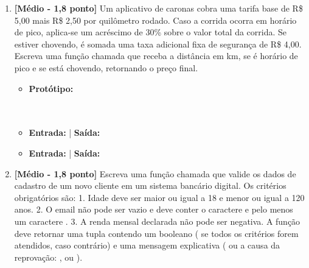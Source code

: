 \begin{enumerate}[label=\textbf{Q\arabic*.}, start=11]


\vspace{0.4cm}

\item \textbf{[Médio - 1,8 ponto]} Um aplicativo de caronas cobra uma tarifa base de R\$ 5,00 mais R\$ 2,50 por quilômetro rodado. Caso a corrida ocorra em horário de pico, aplica-se um acréscimo de 30\% sobre o valor total da corrida. Se estiver chovendo, é somada uma taxa adicional fixa de segurança de R\$ 4,00. Escreva uma função chamada  que receba a distância em km, se é horário de pico e se está chovendo, retornando o preço final.

\begin{itemize}[leftmargin=*]
    \item \textbf{Protótipo:}\newline {}\\\\\\
    \item \textbf{Entrada:}  | \textbf{Saída:} 
    \item \textbf{Entrada:}  | \textbf{Saída:} 
\end{itemize}



\vspace{0.4cm}

\item \textbf{[Médio - 1,8 ponto]} Escreva uma função chamada  que valide os dados de cadastro de um novo cliente em um sistema bancário digital. Os critérios obrigatórios são:
1. Idade deve ser maior ou igual a 18 e menor ou igual a 120 anos.
2. O email não pode ser vazio e deve conter o caractere  e pelo menos um caractere .
3. A renda mensal declarada não pode ser negativa.
A função deve retornar uma tupla contendo um booleano ( se todos os critérios forem atendidos,  caso contrário) e uma mensagem explicativa ( ou a causa da reprovação: ,  ou ).


\end{enumerate}
